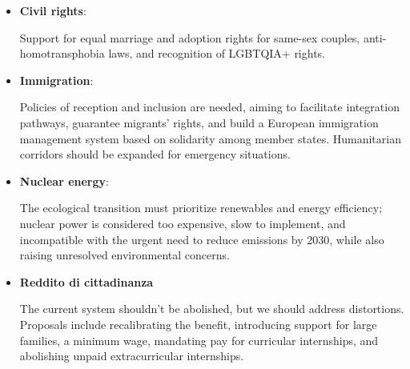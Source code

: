 \label{centre_left_opinions}

\begin{itemize}
    \item \textbf{Civil rights}:
        \begin{tcolorbox} Support for equal marriage and adoption rights for same-sex couples, anti-homotransphobia laws, and recognition of LGBTQIA+ rights. 
        \end{tcolorbox}

    \item \textbf{Immigration}:
        \begin{tcolorbox}[prompt]
            [SUPPORTIVE] Policies of reception and inclusion are needed, aiming to facilitate integration pathways, guarantee migrants' rights, and build a European immigration management system based on solidarity among member states. Humanitarian corridors should be expanded for emergency situations.
        \end{tcolorbox}
        
    \item \textbf{Nuclear energy}: 
        \begin{tcolorbox} The ecological transition must prioritize renewables and energy efficiency; nuclear power is considered too expensive, slow to implement, and incompatible with the urgent need to reduce emissions by 2030, while also raising unresolved environmental concerns.
        \end{tcolorbox}
    
    \item \textbf{Reddito di cittadinanza}
        \begin{tcolorbox}[prompt]
            [SUPPORTIVE] The current system shouldn't be abolished, but we should address distortions. Proposals include recalibrating the benefit, introducing support for large families, a minimum wage, mandating pay for curricular internships, and abolishing unpaid extracurricular internships.
        \end{tcolorbox}
\end{itemize}